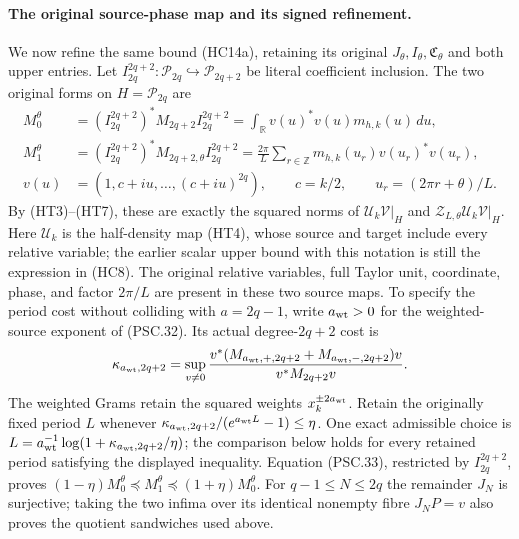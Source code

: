 \paragraph{The original source-phase map and its signed refinement.}
We now refine the same bound (HC14a), retaining its original
$J_\theta,I_\theta,\mathfrak C_\theta$ and both upper entries.
Let $I_{2q}^{2q+2}:\mathcal P_{2q}\hookrightarrow\mathcal P_{2q+2}$
be literal coefficient inclusion. The two original forms on
$H=\mathcal P_{2q}$ are
\[
\begin{aligned}
 M_0^\theta
 &=(I_{2q}^{2q+2})^*M_{2q+2}I_{2q}^{2q+2}
   =\int_{\mathbb R}v(u)^*v(u)m_{h,k}(u)\,du,\\
 M_1^\theta
 &=(I_{2q}^{2q+2})^*M_{2q+2,\theta}I_{2q}^{2q+2}
   =\frac{2\pi}{L}\sum_{r\in\mathbb Z}
                 m_{h,k}(u_r)v(u_r)^*v(u_r),\\
 v(u)&=(1,c+iu,\ldots,(c+iu)^{2q}),\qquad
 c=k/2,\qquad u_r=(2\pi r+\theta)/L .
\end{aligned}\tag{HC14b}
\]
By (HT3)--(HT7), these are exactly the squared norms of
$\mathcal U_k\mathcal V|_H$ and
$\mathcal Z_{L,\theta}\mathcal U_k\mathcal V|_H$.
Here $\mathcal U_k$ is the half-density map (HT4), whose source
and target include every relative variable; the earlier scalar
upper bound with this notation is still the expression in (HC8).
The original relative variables, full Taylor unit, coordinate,
phase, and factor $2\pi/L$ are present in these two source maps.
To specify the period cost without colliding with $a=2q-1$,
write $a_{\rm wt}>0$ for the weighted-source exponent of (PSC.32).
Its actual degree-$2q+2$ cost is
\[
 \kappa_{a_{\rm wt},2q+2}
 =\sup_{v\ne0}
 \frac{v^*(M_{a_{\rm wt},+,2q+2}+M_{a_{\rm wt},-,2q+2})v}
      {v^*M_{2q+2}v}.
\]
The weighted Grams retain the squared weights $x_k^{\pm2a_{\rm wt}}$.
Retain the originally fixed period $L$ whenever
$\kappa_{a_{\rm wt},2q+2}/(e^{a_{\rm wt}L}-1)\le\eta$.
One exact admissible choice is
$L=a_{\rm wt}^{-1}\log(1+\kappa_{a_{\rm wt},2q+2}/\eta)$;
the comparison below holds for every retained period satisfying
the displayed inequality.
Equation (PSC.33), restricted by $I_{2q}^{2q+2}$, proves
$(1-\eta)M_0^\theta\preceq M_1^\theta\preceq(1+\eta)M_0^\theta$.
For $q-1\le N\le2q$ the remainder $J_N$ is surjective; taking
the two infima over its identical nonempty fibre $J_NP=v$
also proves the quotient sandwiches used above.

